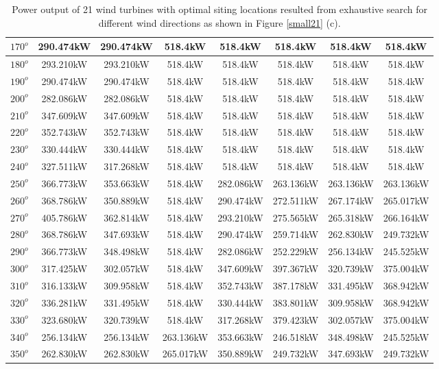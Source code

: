 \begin{table}[H]
\begin{tabular}{|c|c|c|c|c|c|c|c|}
		$170^o$	& 290.474kW	& 290.474kW	& 518.4kW	& 518.4kW	& 518.4kW	& 518.4kW	& 518.4kW	\\ \hline
		$180^o$	& 293.210kW	& 293.210kW	& 518.4kW	& 518.4kW	& 518.4kW	& 518.4kW	& 518.4kW	\\ \hline
		$190^o$	& 290.474kW	& 290.474kW	& 518.4kW	& 518.4kW	& 518.4kW	& 518.4kW	& 518.4kW	\\ \hline
		$200^o$	& 282.086kW	& 282.086kW	& 518.4kW	& 518.4kW	& 518.4kW	& 518.4kW	& 518.4kW	\\ \hline
		$210^o$	& 347.609kW	& 347.609kW	& 518.4kW	& 518.4kW	& 518.4kW	& 518.4kW	& 518.4kW	\\ \hline
		$220^o$	& 352.743kW	& 352.743kW	& 518.4kW	& 518.4kW	& 518.4kW	& 518.4kW	& 518.4kW	\\ \hline
		$230^o$	& 330.444kW	& 330.444kW	& 518.4kW	& 518.4kW	& 518.4kW	& 518.4kW	& 518.4kW	\\ \hline
		$240^o$	& 327.511kW	& 317.268kW	& 518.4kW	& 518.4kW	& 518.4kW	& 518.4kW	& 518.4kW	\\ \hline
		$250^o$	& 366.773kW	& 353.663kW	& 518.4kW	& 282.086kW	& 263.136kW	& 263.136kW	& 263.136kW	\\ \hline
		$260^o$	& 368.786kW	& 350.889kW	& 518.4kW	& 290.474kW	& 272.511kW	& 267.174kW	& 265.017kW	\\ \hline
		$270^o$	& 405.786kW	& 362.814kW	& 518.4kW	& 293.210kW	& 275.565kW	& 265.318kW	& 266.164kW	\\ \hline
		$280^o$	& 368.786kW	& 347.693kW	& 518.4kW	& 290.474kW	& 259.714kW	& 262.830kW	& 249.732kW	\\ \hline
		$290^o$	& 366.773kW	& 348.498kW	& 518.4kW	& 282.086kW	& 252.229kW	& 256.134kW	& 245.525kW	\\ \hline
		$300^o$	& 317.425kW	& 302.057kW	& 518.4kW	& 347.609kW	& 397.367kW	& 320.739kW	& 375.004kW	\\ \hline
		$310^o$	& 316.133kW	& 309.958kW	& 518.4kW	& 352.743kW	& 387.178kW	& 331.495kW	& 368.942kW	\\ \hline
		$320^o$	& 336.281kW	& 331.495kW	& 518.4kW	& 330.444kW	& 383.801kW	& 309.958kW	& 368.942kW	\\ \hline
		$330^o$	& 323.680kW	& 320.739kW	& 518.4kW	& 317.268kW	& 379.423kW	& 302.057kW	& 375.004kW	\\ \hline
		$340^o$	& 256.134kW	& 256.134kW	& 263.136kW	& 353.663kW	& 246.518kW	& 348.498kW	& 245.525kW	\\ \hline
		$350^o$	& 262.830kW	& 262.830kW	& 265.017kW	& 350.889kW	& 249.732kW	& 347.693kW	& 249.732kW	\\ \hline
        	\end{tabular}
        	\caption{Power output of 21 wind turbines with optimal siting locations resulted from exhaustive search for different wind directions as shown in Figure \ref{small21} (c).}
        	\label{table21c}
        \end{table}
        \doublespacing
        
